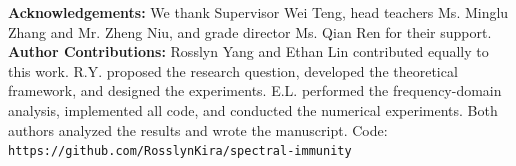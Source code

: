\documentclass[9pt,twocolumn]{article}
\theoremstyle{remark}
\theoremstyle{definition}
\renewcommand{\baselinestretch}{0.66}
\begin{document}
\vspace{0.2pt}
{\scriptsize\noindent\textbf{Acknowledgements:} We thank Supervisor Wei Teng, head teachers Ms. Minglu Zhang and Mr. Zheng Niu, and grade director Ms. Qian Ren for their support. 
\vspace{0.5pt}
{\scriptsize\noindent\textbf{Author Contributions:} Rosslyn Yang and Ethan Lin contributed equally to this work. R.Y. proposed the research question, developed the theoretical framework, and designed the experiments. E.L. performed the frequency-domain analysis, implemented all code, and conducted the numerical experiments. Both authors analyzed the results and wrote the manuscript.}
Code: \texttt{https://github.com/RosslynKira/spectral-immunity}}

\begingroup
\scriptsize
\setlength{\itemsep}{-0.5pt}
\setlength{\parsep}{0pt}
\renewcommand{\baselinestretch}{0.60}
\end{document}
